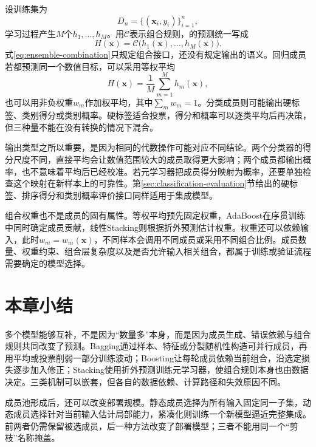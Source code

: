 设训练集为
\[
  D_n=\{(\bm{x}_i,y_i)\}_{i=1}^{n},
\]
学习过程产生$M$个$h_1,\ldots,h_M$。用$\mathcal{C}$表示组合规则，的预测统一写成
\begin{equation}
  H(\bm{x})
  =\mathcal{C}\bigl(h_1(\bm{x}),\ldots,h_M(\bm{x})\bigr).
  \label{eq:ensemble-combination}
\end{equation}
式\eqref{eq:ensemble-combination}只规定组合接口，还没有规定输出的语义。回归成员若都预测同一个数值目标，可以采用等权平均
\[
  H(\bm{x})=\frac{1}{M}\sum_{m=1}^{M}h_m(\bm{x}),
\]
也可以用非负权重$w_m$作加权平均，其中$\sum_m w_m=1$。分类成员则可能输出硬标签、类别得分或类别概率。硬标签适合投票，得分和概率可以逐类平均后再决策，但三种量不能在没有转换的情况下混合。

输出类型之所以重要，是因为相同的代数操作可能对应不同结论。两个分类器的得分尺度不同，直接平均会让数值范围较大的成员取得更大影响；两个成员都输出概率，也不意味着平均后已经校准。若元学习器把成员得分映射为概率，还要单独检查这个映射在新样本上的可靠性。第\ref{sec:classification-evaluation}节给出的硬标签、排序得分和类别概率评价接口同样适用于集成模型。

组合权重也不是成员的固有属性。等权平均预先固定权重，AdaBoost在序贯训练中同时确定成员贡献，线性Stacking则根据折外预测估计权重。权重还可以依赖输入，此时$w_m=w_m(\bm{x})$，不同样本会调用不同成员或采用不同组合比例。成员数量、权重约束、组合层复杂度以及是否允许输入相关组合，都属于训练或验证流程需要确定的模型选择。








\section{本章小结}
\label{sec:ensemble-summary}

多个模型能够互补，不是因为“数量多”本身，而是因为成员生成、错误依赖与组合规则共同改变了预测。Bagging通过样本、特征或分裂随机性构造可并行成员，再用平均或投票削弱一部分训练波动；Boosting让每轮成员依赖当前组合，沿选定损失逐步加入修正；Stacking使用折外预测训练元学习器，使组合规则本身也由数据决定。三类机制可以嵌套，但各自的数据依赖、计算路径和失效原因不同。

成员池形成后，还可以改变部署规模。静态成员选择为所有输入固定同一子集，动态成员选择针对当前输入估计局部能力，紧凑化则训练一个新模型逼近完整集成。前两者仍需保留被选成员，后一种方法改变了部署模型；三者不能用同一个“剪枝”名称掩盖。

